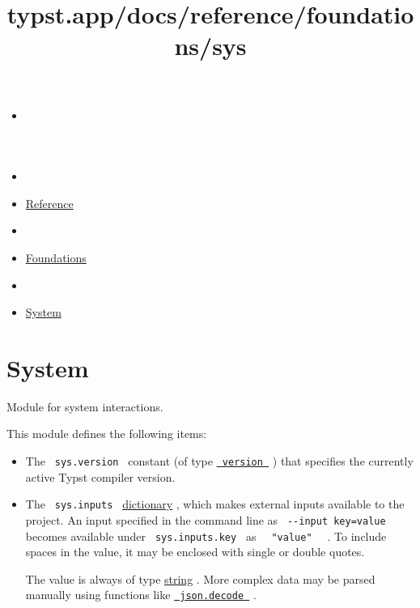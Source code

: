 \title{typst.app/docs/reference/foundations/sys}

\begin{itemize}
\tightlist
\item
  \href{/docs}{}
\item
  
\item
  \href{/docs/reference/}{Reference}
\item
  
\item
  \href{/docs/reference/foundations/}{Foundations}
\item
  
\item
  \href{/docs/reference/foundations/sys}{System}
\end{itemize}

\section{System}\label{summary}

Module for system interactions.

This module defines the following items:

\begin{itemize}
\item
  The \texttt{\ sys.version\ } constant (of type
  \href{/docs/reference/foundations/version/}{\texttt{\ version\ }} )
  that specifies the currently active Typst compiler version.
\item
  The \texttt{\ sys.inputs\ }
  \href{/docs/reference/foundations/dictionary/}{dictionary} , which
  makes external inputs available to the project. An input specified in
  the command line as \texttt{\ -\/-input\ key=value\ } becomes
  available under \texttt{\ sys.inputs.key\ } as
  \texttt{\ }{\texttt{\ "value"\ }}\texttt{\ } . To include spaces in
  the value, it may be enclosed with single or double quotes.

  The value is always of type
  \href{/docs/reference/foundations/str/}{string} . More complex data
  may be parsed manually using functions like
  \href{/docs/reference/data-loading/json/\#definitions-decode}{\texttt{\ json.decode\ }}
  .
\end{itemize}

\href{/docs/reference/foundations/style/}{\pandocbounded{}}

